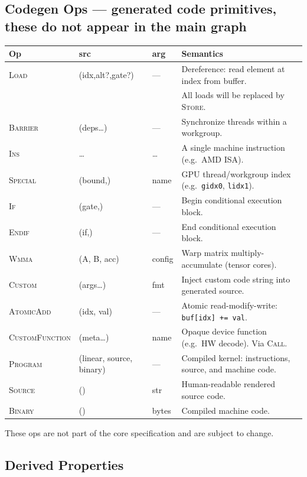 \documentclass[10pt,letterpaper]{article}
\newcommand{\op}[1]{\textsc{#1}}
\begin{document}
\subsection*{Codegen Ops \normalfont\small--- generated code primitives, these do not appear in the main graph}

\begin{tabular}{@{}l l l l@{}}
\toprule
\textbf{Op} & \textbf{src} & \textbf{arg} & \textbf{Semantics} \\
\midrule
\op{Load} & (idx,alt?,gate?) & --- & Dereference: read element at index from buffer. \\
 & & & All loads will be replaced by \op{Store}. \\
\op{Barrier} & (deps\ldots) & --- & Synchronize threads within a workgroup. \\
\op{Ins} & \ldots & \ldots & A single machine instruction (e.g.\ AMD ISA). \\
\op{Special} & (bound,) & name & GPU thread/workgroup index (e.g.\ \texttt{gidx0}, \texttt{lidx1}). \\
\op{If} & (gate,) & --- & Begin conditional execution block. \\
\op{Endif} & (if,) & --- & End conditional execution block. \\
\op{Wmma} & (A, B, acc) & config & Warp matrix multiply-accumulate (tensor cores). \\
\op{Custom} & (args\ldots) & fmt & Inject custom code string into generated source. \\
\op{AtomicAdd} & (idx, val) & --- & Atomic read-modify-write: \texttt{buf[idx] += val}. \\[4pt]
\op{CustomFunction} & (meta\ldots) & name & Opaque device function (e.g.\ HW decode). Via \op{Call}. \\
\op{Program} & (linear, source, binary) & --- & Compiled kernel: instructions, source, and machine code. \\
\op{Source} & () & str & Human-readable rendered source code. \\
\op{Binary} & () & bytes & Compiled machine code. \\
\bottomrule
\end{tabular}

\smallskip
These ops are not part of the core specification and are subject to change.

\subsection*{Derived Properties}
\end{document}
